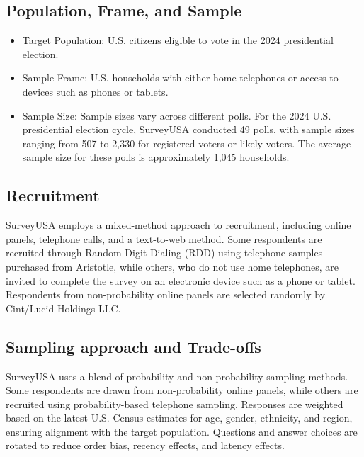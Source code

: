 \documentclass[
  letterpaper,
  DIV=11,
  numbers=noendperiod]{scrartcl}
\providecommand{\tightlist}{%
  \setlength{\itemsep}{0pt}\setlength{\parskip}{0pt}}\usepackage{longtable,booktabs,array}
\begin{document}
\subsection{\texorpdfstring{Population, Frame, and Sample\\
}{Population, Frame, and Sample }}\label{population-frame-and-sample}

\begin{itemize}
\tightlist
\item
  Target Population: U.S. citizens eligible to vote in the 2024
  presidential election.\\
\item
  Sample Frame: U.S. households with either home telephones or access to
  devices such as phones or tablets.\\
\item
  Sample Size: Sample sizes vary across different polls. For the 2024
  U.S. presidential election cycle, SurveyUSA conducted 49 polls, with
  sample sizes ranging from 507 to 2,330 for registered voters or likely
  voters. The average sample size for these polls is approximately 1,045
  households.\\
\end{itemize}

\subsection{\texorpdfstring{Recruitment\\
}{Recruitment }}\label{recruitment}

SurveyUSA employs a mixed-method approach to recruitment, including
online panels, telephone calls, and a text-to-web method. Some
respondents are recruited through Random Digit Dialing (RDD) using
telephone samples purchased from Aristotle, while others, who do not use
home telephones, are invited to complete the survey on an electronic
device such as a phone or tablet. Respondents from non-probability
online panels are selected randomly by Cint/Lucid Holdings LLC.\\

\subsection{\texorpdfstring{Sampling approach and Trade-offs\\
}{Sampling approach and Trade-offs }}\label{sampling-approach-and-trade-offs}

SurveyUSA uses a blend of probability and non-probability sampling
methods. Some respondents are drawn from non-probability online panels,
while others are recruited using probability-based telephone sampling.
Responses are weighted based on the latest U.S. Census estimates for
age, gender, ethnicity, and region, ensuring alignment with the target
population. Questions and answer choices are rotated to reduce order
bias, recency effects, and latency effects.\\
\end{document}
